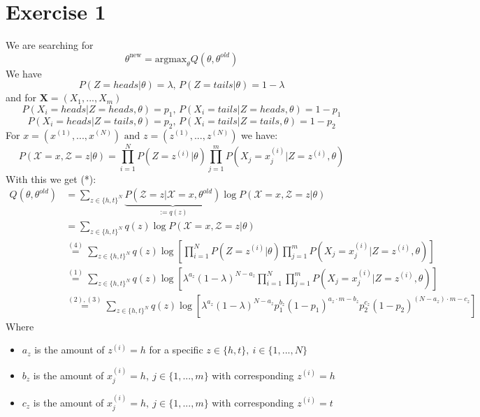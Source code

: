 \documentclass{article}
\begin{document}
\section*{Exercise 1}
We are searching for 
$$
\theta^{\text{new}} = \text{argmax}_{\theta} Q(\theta,\theta^{old})
$$
We have\\
\begin{equation}
P(Z = heads | \theta) = \lambda \text{, } P(Z = tails | \theta) = 1 - \lambda
\end{equation}
and for $\mathbf{X} =  (X_1,...,X_m)$\\
\begin{equation}
P(X_i = heads| Z = heads , \theta) = p_1 \text{, } P(X_i = tails| Z = heads , \theta) = 1- p_1
\end{equation}
\begin{equation}
P(X_i = heads| Z = tails, \theta) = p_2\text{, }P(X_i = tails| Z = tails, \theta) = 1- p_2
\end{equation}
For $x = (x^{(1)},...,x^{(N)}) \text{ and }z = (z^{(1)},...,z^{(N)})$ we have:
\begin{equation}
P(\mathcal{X} = x, \mathcal{Z} = z | \theta) =  \prod \limits _{i=1}^N P(Z = z^{(i)} | \theta) \prod \limits _{j=1}^m P(X_j = x_j^{(i)} | Z = z^{(i)}, \theta)
\end{equation}
With this we get (*):
\begin{align*}
Q(\theta,\theta^{old})& = \sum \limits _{z \in \{h, t\}^N} \underbrace{P(\mathcal{Z} = z | \mathcal{X} = x,\theta^{old})}_{:=q(z)}\log P(\mathcal{X} = x, \mathcal{Z} = z | \theta)&\\
& = \sum \limits _{z \in \{h, t\}^N} q(z)\log P(\mathcal{X} = x, \mathcal{Z} = z | \theta)&\\
& \stackrel{(4)}{=} \sum \limits _{z \in \{h, t\}^N} q(z)\log \left [ \prod \limits _{i=1}^N P(Z = z^{(i)} | \theta) \prod \limits _{j=1}^m P(X_j = x_j^{(i)} | Z = z^{(i)}, \theta) \right ]&\\
& \stackrel{(1)}{=} \sum \limits _{z \in \{h, t\}^N} q(z)\log \left [ 
\lambda^{a_z} (1  - \lambda)^{N - a_z} \prod \limits _{i=1}^N \prod \limits _{j=1}^m P(X_j = x_j^{(i)} | Z = z^{(i)}, \theta) \right ]&\\
& \stackrel{(2),(3)}{=} \sum \limits _{z \in \{h, t\}^N} q(z)\log [ 
\lambda^{a_z} (1  - \lambda)^{N - a_z} p_1^{b_z}(1 - p_1)^{a_z \cdot m - b_z} p_2^{c_z}(1 - p_2)^{(N - a_z) \cdot m - c_z} ]&
\end{align*}
Where 
\begin{itemize}
	\item $a_z$ is the amount of $z^{(i)} = h$ for a specific $z \in \{h,t\}, ~i \in \{1,...,N\}$
	\item $b_z$ is the amount of $x^{(i)}_{j} = h,~j \in \{1,...,m\}$ with corresponding $z^{(i)} = h$ 
	\item $c_z$ is the amount of $x^{(i)}_{j} = h,~j \in \{1,...,m\}$ with corresponding $z^{(i)} = t$ 
\end{itemize}
\end{document}
